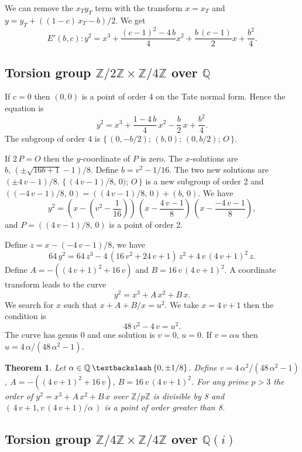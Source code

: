 \documentclass[a4paper, 11pt, pdftex]{report}
\theoremstyle{plain}
\newtheorem{theorem}{Theorem}[chapter]
\theoremstyle{definition}
\begin{document}
We can remove the $x_T y_T$ term with the transform $x = x_T$ and $y = y_T + ((1 - c)\,x_T -  b)/2$.
We get
$$E'(b, c): y^2 = x^3 + \frac{(c - 1)^2 - 4\,b}{4} x^2 + \frac{b\,(c - 1)}{2} x + \frac{b^2}{4}.$$

\subsection{Torsion group $\mathbb{Z}/2\mathbb{Z} \times \mathbb{Z}/4\mathbb{Z}$ over $\mathbb{Q}$}

If $c = 0$ then $(0, 0)$ is a point of order 4 on the Tate normal form. Hence the equation is
$$y^2 = x^3 + \frac{1 - 4\,b}{4}\, x^2 - \frac{b}{2}\, x + \frac{b^2}{4}.$$
The subgroup of order 4 is $\{\,(0, -b/2);\, (b, 0);\, (0, b/2);\, O\, \}$.

If $2\,P = O$ then the $y$-coordinate of $P$ is zero. The $x$-solutions are
$b,\, (\pm\sqrt{16 b+1} - 1)/8$. Define $b = v^2 - 1/16$. The two new solutions are
 $(\pm4\,v - 1)/8$. $\{\,(4\,v - 1)/8,\, 0);\, O\, \}$ is a new subgroup of order 2
and $((-4\,v - 1)/8,\, 0) = ((4\,v - 1)/8,\, 0) + (b,\, 0)$.
We have
$$y^2 = \left(x - \left(v^2 - \frac{1}{16}\right)\right)\,
 \left(x - \frac{4\,v - 1}{8}\right)\, \left(x - \frac{-4\,v - 1}{8}\right),$$
and $P = ((4\,v - 1)/8,\, 0)$ is a point of order 2.

Define $z = x - (-4\,v - 1)/8$, we have
$$64\, y^2 = 64\, z^3 - 4\,(16\,v^2 + 24\,v + 1)\, z^2 + 4\,v\,(4\,v + 1)^2\, z.$$
Define $A = -((4\,v+1)^2 + 16\,v)$ and $B = 16\,v\,(4\,v + 1)^2$.
A coordinate transform leads to the curve
$$y^2 = x^3 + A\, x^2 + B\, x.$$
We search for $x$ such that $x + A + B / x = u^2.$ We take $x = 4\,v + 1$ then
the condition is
$$48\,v^2 - 4\,v = u^2.$$
The curve has genus 0 and one solution is $v = 0$, $u = 0$. If $v = \alpha u$ then
$u = 4\,\alpha / (48\, \alpha^2 - 1)$.

\begin{theorem}
Let $\alpha \in \mathbb{Q}\, \textbackslash \, \{0, \pm1/8\}$.
Define $v = 4\,\alpha^2 / (48\, \alpha^2 - 1)$, $A = -((4\,v+1)^2 + 16\,v)$,
$B = 16\,v\,(4\,v + 1)^2$. For any prime $p > 3$ the order of $y^2 = x^3 + A\, x^2 + B\, x$
over $\mathbb{Z}/p\mathbb{Z}$ is divisible by 8 and $(\,4\,v + 1, v\,(4\,v + 1) / \alpha \,)$
is a point of order greater than 8.
\end{theorem}

\subsection{Torsion group $\mathbb{Z}/4\mathbb{Z} \times \mathbb{Z}/4\mathbb{Z}$ over $\mathbb{Q}(i)$}
\end{document}
